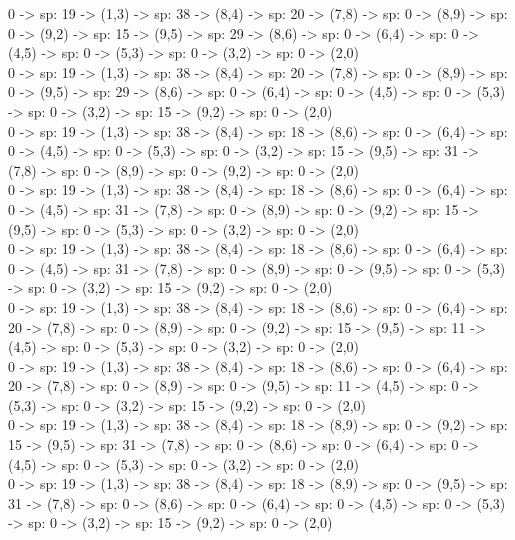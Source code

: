 \documentclass[10pt,a4paper]{article}
\begin{document}
0 -> sp: 19 -> (1,3) -> sp: 38 -> (8,4) -> sp: 20 -> (7,8) -> sp: 0 -> (8,9) -> sp: 0 -> (9,2) -> sp: 15 -> (9,5) -> sp: 29 -> (8,6) -> sp: 0 -> (6,4) -> sp: 0 -> (4,5) -> sp: 0 -> (5,3) -> sp: 0 -> (3,2) -> sp: 0 -> (2,0)\\

0 -> sp: 19 -> (1,3) -> sp: 38 -> (8,4) -> sp: 20 -> (7,8) -> sp: 0 -> (8,9) -> sp: 0 -> (9,5) -> sp: 29 -> (8,6) -> sp: 0 -> (6,4) -> sp: 0 -> (4,5) -> sp: 0 -> (5,3) -> sp: 0 -> (3,2) -> sp: 15 -> (9,2) -> sp: 0 -> (2,0)\\

0 -> sp: 19 -> (1,3) -> sp: 38 -> (8,4) -> sp: 18 -> (8,6) -> sp: 0 -> (6,4) -> sp: 0 -> (4,5) -> sp: 0 -> (5,3) -> sp: 0 -> (3,2) -> sp: 15 -> (9,5) -> sp: 31 -> (7,8) -> sp: 0 -> (8,9) -> sp: 0 -> (9,2) -> sp: 0 -> (2,0)\\

0 -> sp: 19 -> (1,3) -> sp: 38 -> (8,4) -> sp: 18 -> (8,6) -> sp: 0 -> (6,4) -> sp: 0 -> (4,5) -> sp: 31 -> (7,8) -> sp: 0 -> (8,9) -> sp: 0 -> (9,2) -> sp: 15 -> (9,5) -> sp: 0 -> (5,3) -> sp: 0 -> (3,2) -> sp: 0 -> (2,0)\\

0 -> sp: 19 -> (1,3) -> sp: 38 -> (8,4) -> sp: 18 -> (8,6) -> sp: 0 -> (6,4) -> sp: 0 -> (4,5) -> sp: 31 -> (7,8) -> sp: 0 -> (8,9) -> sp: 0 -> (9,5) -> sp: 0 -> (5,3) -> sp: 0 -> (3,2) -> sp: 15 -> (9,2) -> sp: 0 -> (2,0)\\

0 -> sp: 19 -> (1,3) -> sp: 38 -> (8,4) -> sp: 18 -> (8,6) -> sp: 0 -> (6,4) -> sp: 20 -> (7,8) -> sp: 0 -> (8,9) -> sp: 0 -> (9,2) -> sp: 15 -> (9,5) -> sp: 11 -> (4,5) -> sp: 0 -> (5,3) -> sp: 0 -> (3,2) -> sp: 0 -> (2,0)\\

0 -> sp: 19 -> (1,3) -> sp: 38 -> (8,4) -> sp: 18 -> (8,6) -> sp: 0 -> (6,4) -> sp: 20 -> (7,8) -> sp: 0 -> (8,9) -> sp: 0 -> (9,5) -> sp: 11 -> (4,5) -> sp: 0 -> (5,3) -> sp: 0 -> (3,2) -> sp: 15 -> (9,2) -> sp: 0 -> (2,0)\\

0 -> sp: 19 -> (1,3) -> sp: 38 -> (8,4) -> sp: 18 -> (8,9) -> sp: 0 -> (9,2) -> sp: 15 -> (9,5) -> sp: 31 -> (7,8) -> sp: 0 -> (8,6) -> sp: 0 -> (6,4) -> sp: 0 -> (4,5) -> sp: 0 -> (5,3) -> sp: 0 -> (3,2) -> sp: 0 -> (2,0)\\

0 -> sp: 19 -> (1,3) -> sp: 38 -> (8,4) -> sp: 18 -> (8,9) -> sp: 0 -> (9,5) -> sp: 31 -> (7,8) -> sp: 0 -> (8,6) -> sp: 0 -> (6,4) -> sp: 0 -> (4,5) -> sp: 0 -> (5,3) -> sp: 0 -> (3,2) -> sp: 15 -> (9,2) -> sp: 0 -> (2,0)\\
\end{document}

